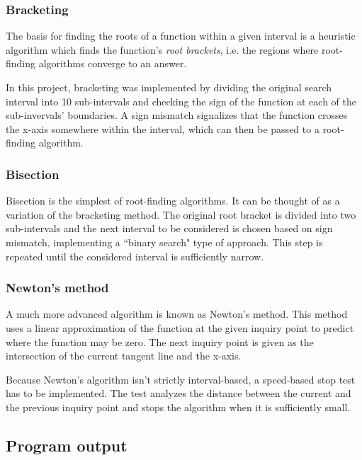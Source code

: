 \documentclass{article}
\begin{document}
	\subsubsection{Bracketing}
	
	The basis for finding the roots of a function within a given interval is a
	heuristic algorithm which finds the function's \textit {root brackets},
	i.e. the regions where root-finding algorithms converge to an answer.
	
	In this project, bracketing was implemented by dividing the original search
	interval into 10 sub-intervals and checking the sign of the function at
	each of the sub-invervals' boundaries. A sign mismatch signalizes that the
	function crosses the x-axis somewhere within the interval, which can then
	be passed to a root-finding algorithm.
	
	\subsubsection{Bisection}
	
	Bisection is the simplest of root-finding algorithms. It can be thought of
	as a variation of the bracketing method. The original root bracket is
	divided into two sub-intervals and the next interval to be considered is
	chosen based on sign mismatch, implementing a ``binary search" type of
	approach. This step is repeated until the considered interval is
	sufficiently narrow.
	
	\subsubsection{Newton's method}
	
	A much more advanced algorithm is known as Newton's method. This method
	uses a linear approximation of the function at the given inquiry point to
	predict where the function may be zero. The next inquiry point is given as
	the intersection of the current tangent line and the x-axis.
	
	Because Newton's algorithm isn't strictly interval-based, a speed-based
	stop test has to be implemented. The test analyzes the distance between the
	current and the previous inquiry point and stops the algorithm when it is
	sufficiently small.
	
	\subsection{Program output}
	
\end{document}

